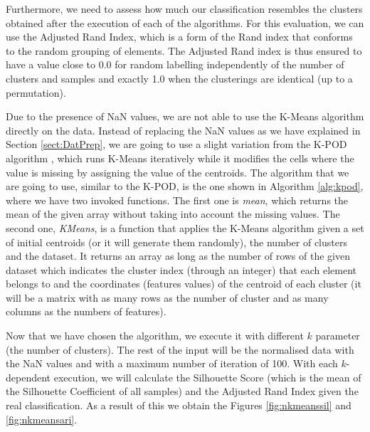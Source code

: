 Furthermore, we need to assess how much our classification resembles the clusters obtained after the execution of each of the algorithms. For this evaluation, we can use the Adjusted Rand Index, which is a form of the Rand index \citep{rand1971objective} that conforms to the random grouping of elements. The Adjusted Rand index is thus ensured to have a value close to 0.0 for random labelling independently of the number of clusters and samples and exactly 1.0 when the clusterings are identical (up to a permutation).

Due to the presence of NaN values, we are not able to use the K-Means algorithm directly on the data. Instead of replacing the NaN values as we have explained in Section \ref{sect:DatPrep}, we are going to use a slight variation from the K-POD algorithm \citep{chi2016k}, which runs K-Means iteratively while it modifies the cells where the value is missing by assigning the value of the centroids. The algorithm that we are going to use, similar to the K-POD, is the one shown in Algorithm \ref{alg:kpod}, where we have two invoked functions. The first one is \textit{mean}, which returns the mean of the given array without taking into account the missing values. The second one, \textit{KMeans}, is a function that applies the K-Means algorithm given a set of initial centroids (or it will generate them randomly), the number of clusters and the dataset. It returns an array as long as the number of rows of the given dataset which indicates the cluster index (through an integer) that each element belongs to and the coordinates (features values) of the centroid of each cluster (it will be a matrix with as many rows as the number of cluster and as many columns as the numbers of features).

Now that we have chosen the algorithm, we execute it with different $k$ parameter (the number of clusters). The rest of the input will be the normalised data with the NaN values and with a maximum number of iteration of 100. With each $k$-dependent execution, we will calculate the Silhouette Score (which is the mean of the Silhouette Coefficient of all samples) and the Adjusted Rand Index given the real classification. As a result of this we obtain the Figures \ref{fig:nkmeanssil} and \ref{fig:nkmeansari}.

